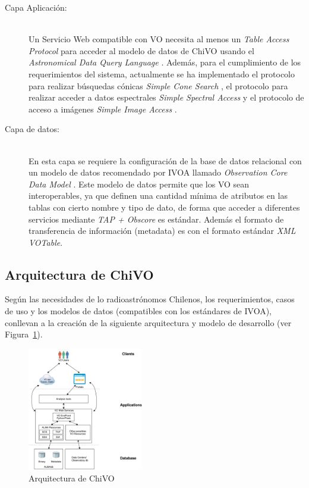 \begin{description}
    \item[Capa Aplicación:] \hfill \\
        Un Servicio Web compatible con VO necesita al menos un \emph{Table Access
        Protocol} \cite{dowler2010table} para acceder al modelo de datos de ChiVO usando el
        \emph{Astronomical Data Query Language} \cite{yasuda2004astronomical}.
        Además, para el cumplimiento de los requerimientos del sistema,
        actualmente se ha implementado
        el protocolo para realizar búsquedas cónicas \emph{Simple Cone Search}
        \cite{williams2008simple}, el protocolo para realizar acceder a datos
        espectrales \emph{Simple Spectral Access} \cite{tody2008simple} y el protocolo de
        acceso a imágenes \emph{Simple Image Access} \cite{tody2004simple}.

    \item[Capa de datos:] \hfill \\
        En esta capa se requiere la configuración de la base de datos relacional con
        un modelo de datos recomendado por IVOA llamado \emph{Observation Core Data
        Model} \cite{louys2011ivoa}. Este modelo de datos permite que los VO sean interoperables,
        ya que definen una cantidad mínima de atributos en las tablas con cierto
        nombre y tipo de dato, de forma que acceder a diferentes servicios mediante
        \emph{TAP + Obscore} es estándar.
        Además el formato de transferencia de información (metadata) es con el
        formato estándar \emph{XML VOTable}.
\end{description}

\subsection{Arquitectura de ChiVO}

Según las necesidades de lo radioastrónomos Chilenos, los requerimientos, casos de
uso y los modelos de datos (compatibles con los estándares de IVOA),
conllevan a la creación de la siguiente arquitectura y modelo de desarrollo (ver
Figura~\ref{fig:chivoarch}).

\begin{figure}[ht]
    \centering
    \includegraphics[width=0.45\textwidth]{images/chivo_capas.png}
    \caption{Arquitectura de ChiVO}
    \label{fig:chivoarch}
\end{figure}

